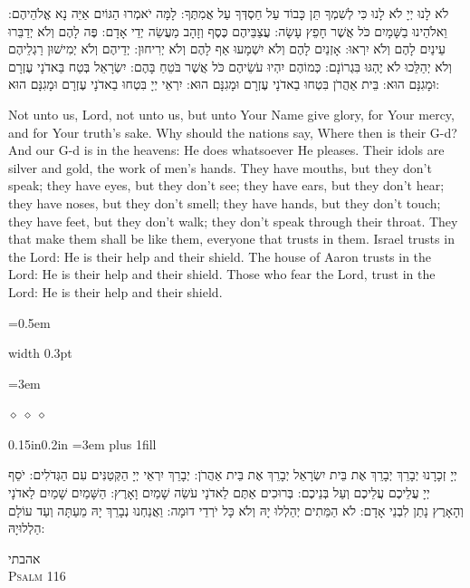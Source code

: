 \documentclass[11pt, openany]{book}
\newenvironment{hebrewblock}{%
  \par\vspace{4pt}
  \begin{adjustwidth}{0.15in}{0.2in}
  \begingroup
  \hebrewfont\TeXXeTstate=1\beginR
  \large
  \setstretch{1.4}
  \emergencystretch=3em
  \tolerance=9999
  \parindent=0pt\relax
  \leftskip=0pt plus 1fill
  \parfillskip=0pt\relax
}{%
  \endR\endgroup
  \end{adjustwidth}
  \par\vspace{2pt}
}
\newcommand{\sederdivider}{%
  \par\vspace{6pt}
  \begin{center}
    \textcolor{sedergold}{\pgfornament[width=1.5cm]{11}}
  \end{center}
  \par\vspace{6pt}
}
\newlength{\bidiHebWidth}
\newlength{\bidiEngWidth}
\newenvironment{bilingual}{%
  \par\vspace{4pt}%
}{%
  \noindent
  \begin{minipage}[t]{\bidiEngWidth}
    \setstretch{1.4}\emergencystretch=0.5em\normalsize
    \usebox{\bidiEngBox}
  \end{minipage}%
  \hfill
  {\color{sedergold}\vrule width 0.3pt}%
  \hfill
  \begin{minipage}[t]{\bidiHebWidth}
    \begingroup\hebrewfont\TeXXeTstate=1\beginR
    \large\setstretch{1.4}\emergencystretch=3em\tolerance=9999\parindent=0pt\relax
    \usebox{\bidiHebBox}
    \endR\endgroup
  \end{minipage}%
  \par\vspace{2pt}%
}
\newenvironment{hebrewcol}{%
  \begin{lrbox}{\bidiHebBox}\begin{minipage}{\bidiHebWidth}%
}{%
  \end{minipage}\end{lrbox}%
}
\newenvironment{englishcol}{%
  \begin{lrbox}{\bidiEngBox}\begin{minipage}{\bidiEngWidth}%
}{%
  \end{minipage}\end{lrbox}%
}
\newcommand{\parasep}{%
  \par\vspace{3pt}
  \begin{center}
    \textcolor{sedergold!50}{\tiny$\diamond\;\diamond\;\diamond$}
  \end{center}
  \par\vspace{3pt}
}
\newcommand{\subsedertitle}[2]{%
  \par\vspace{8pt}
  \begin{center}
    {\hebrewfontlarge\TeXXeTstate=1\beginR\textcolor{sederblue}{#1}\endR}\\[3pt]
    {\normalsize\scshape\textcolor{sederblue}{#2}}
  \end{center}
  \par\vspace{3pt}
}
\begin{document}
\begin{bilingual}
\begin{hebrewcol}
לֹא לָנוּ יְיָ לֹא לָנוּ כִּי לְשִׁמְךָ תֵּן כָּבוֹד עַל חַסְדְּךָ עַל אֲמִתֶּךָ: לָמָּה יֹאמְרוּ הַגּוֹיִם אַיֵּה נָא אֱלֹהֵיהֶם: וֵאלֹהֵינוּ בַשָּׁמָיִם כֹּל אֲשֶׁר חָפֵץ עָשָׂה: עֲצַבֵּיהֶם כֶּסֶף וְזָהָב מַעֲשֵׂה יְדֵי אָדָם: פֶּה לָהֶם וְלֹא יְדַבֵּרוּ עֵינַיִם לָהֶם וְלֹא יִרְאוּ: אָזְנַיִם לָהֶם וְלֹא יִשְׁמָעוּ אַף לָהֶם וְלֹא יְרִיחוּן: יְדֵיהֶם וְלֹא יְמִישׁוּן רַגְלֵיהֶם וְלֹא יְהַלֵּכוּ לֹא יֶהְגּוּ בִּגְרוֹנָם: כְּמוֹהֶם יִהְיוּ עֹשֵׂיהֶם כֹּל אֲשֶׁר בֹּטֵחַ בָּהֶם: יִשְׂרָאֵל בְּטַח בַּאדֹנָי עֶזְרָם וּמָגִנָּם הוּא: בֵּית אַהֲרֹן בִּטְחוּ בַאדֹנָי עֶזְרָם וּמָגִנָּם הוּא: יִרְאֵי יְיָ בִּטְחוּ בַאדֹנָי עֶזְרָם וּמָגִנָּם הוּא:
\end{hebrewcol}
\begin{englishcol}
Not unto us, Lord, not unto us, but unto Your Name give glory, for Your mercy, and for Your truth's sake. Why should the nations say, Where then is their G-d? And our G-d is in the heavens: He does whatsoever He pleases. Their idols are silver and gold, the work of men's hands. They have mouths, but they don't speak; they have eyes, but they don't see; they have ears, but they don't hear; they have noses, but they don't smell; they have hands, but they don't touch; they have feet, but they don't walk; they don't speak through their throat. They that make them shall be like them, everyone that trusts in them. Israel trusts in the Lord: He is their help and their shield. The house of Aaron trusts in the Lord: He is their help and their shield. Those who fear the Lord, trust in the Lord: He is their help and their shield.
\end{englishcol}
\end{bilingual}
\parasep

\begin{hebrewblock}
יְיָ זְכָרָנוּ יְבָרֵךְ יְבָרֵךְ אֶת בֵּית יִשְׂרָאֵל יְבָרֵךְ אֶת בֵּית אַהֲרֹן: יְבָרֵךְ יִרְאֵי יְיָ הַקְּטַנִּים עִם הַגְּדֹלִים: יֹסֵף יְיָ עֲלֵיכֶם עֲלֵיכֶם וְעַל בְּנֵיכֶם: בְּרוּכִים אַתֶּם לַאדֹנָי עֹשֵׂה שָׁמַיִם וָאָרֶץ: הַשָּׁמַיִם שָׁמַיִם לַאדֹנָי וְהָאָרֶץ נָתַן לִבְנֵי אָדָם: לֹא הַמֵּתִים יְהַלְלוּ יָהּ וְלֹא כָּל יֹרְדֵי דוּמָה: וַאֲנַחְנוּ נְבָרֵךְ יָהּ מֵעַתָּה וְעַד עוֹלָם הַלְלוּיָהּ:
\end{hebrewblock}

\sederdivider

\subsedertitle{אהבתי}{Psalm 116}
\end{document}
